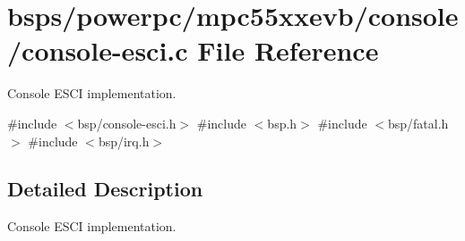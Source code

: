 \hypertarget{console-esci_8c}{}\section{bsps/powerpc/mpc55xxevb/console/console-\/esci.c File Reference}
\label{console-esci_8c}


Console E\+S\+CI implementation.  


{\ttfamily \#include $<$bsp/console-\/esci.\+h$>$}\newline
{\ttfamily \#include $<$bsp.\+h$>$}\newline
{\ttfamily \#include $<$bsp/fatal.\+h$>$}\newline
{\ttfamily \#include $<$bsp/irq.\+h$>$}\newline


\subsection{Detailed Description}
Console E\+S\+CI implementation. 

